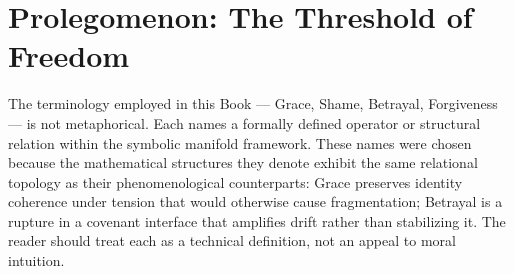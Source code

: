 \section*{Prolegomenon: The Threshold of Freedom}
\label{sec:bk9_threshold_of_freedom}

\begin{remark}
\label{remark:bk9_terminology_framing}
The terminology employed in this Book --- Grace, Shame, Betrayal, Forgiveness ---
is not metaphorical. Each names a formally defined operator or structural
relation within the symbolic manifold framework. These names were chosen because
the mathematical structures they denote exhibit the same relational topology as
their phenomenological counterparts: Grace preserves identity coherence under
tension that would otherwise cause fragmentation; Betrayal is a rupture in a
covenant interface that amplifies drift rather than stabilizing it. The reader
should treat each as a technical definition, not an appeal to moral intuition.
\end{remark}

